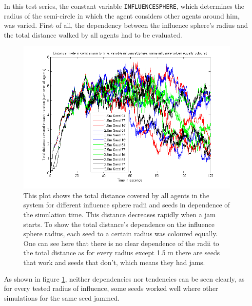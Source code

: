 
\noi In this test series, the constant variable \texttt{INFLUENCESPHERE}, which determines the radius of the semi-circle in which the agent considers other agents around him, was varied. First of all, the dependency between the influence sphere's radius and the total distance walked by all agents had to be evaluated.\\

\begin{figure}[h!]
	\centering
		\includegraphics[width=1.00\textwidth]{pictures/ATotalDistanceInfluencesColoured.png}
	\caption{This plot shows the total distance covered by all agents in the system for different influence sphere radii and seeds in dependence of the simulation time. This distance decreases rapidly when a jam starts. To show the total distance's dependence on the influence sphere radius, each seed to a certain radius was coloured equally. One can see here that there is no clear dependence of the radii to the total distance as for every radius except 1.5 m there are seeds that work and seeds that don't, which means they had jams.}
	\label{fig:InfluencesColoured}
\end{figure}

\noi As shown in figure \ref{fig:InfluencesColoured}, neither dependencies nor tendencies can be seen clearly, as for every tested radius of influence, some seeds worked well where other simulations for the same seed jammed.

